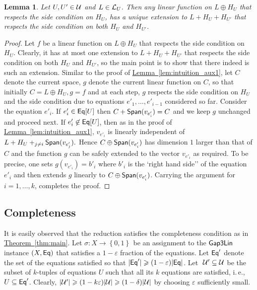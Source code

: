 \documentclass[11pt]{article}
\numberwithin{equation}{section}
\newtheorem{lemma}[theorem]{Lemma}
\theoremstyle{definition}
\theoremstyle{plain}
\newcommand{\ie}{i.\,e.}
\newcommand{\expref}[2]{\hyperref[#2]{#1~\ref{#2}}}
\newcommand\set[1]{{\left\{ #1 \right\}}}
\newcommand\power[1]{\set{0,1}^{#1}}
\newcommand\eps{\varepsilon}
\newcommand*\xor{\mathbin{\oplus}}
\renewcommand\geq{\geqslant}
\begin{document}
\begin{lemma}\label{lem:intuition_aux3} Let $U, U' \in {\cal U}$ and $L \in {\cal L}_U$.  Then any linear function on $L\xor H_U$ that respects the side condition on $H_U$,
has a unique extension to $L + H_U + H_{U'}$ that respects the side condition on both $H_U$ and $H_{U'}$.
\end{lemma}
\begin{proof} Let $f$ be a linear function on $L\xor H_U$ that respects the side condition on $H_U$. Clearly, it has at most one extension
to $L + H_U + H_{U'}$ that respects the side condition on both $H_U$ and $H_{U'}$, so the main point is to show that  there indeed is
such an extension. Similar to the proof of \expref{Lemma}{lem:intuition_aux1}, let $C$ denote the current space, $g$ denote the current linear function on $C$,
 so that initially $C = L \xor H_U, g = f$ and at each step,
$g$ respects the side condition on $H_U$ and the side condition due to equations $e'_1, \ldots, e'_{i-1}$ considered so far. Consider
the equation $e'_i$. If $e'_i \in {\sf Eq}[U]$ then $C + {\sf Span} (v_{e'_i}) = C$ and we keep $g$ unchanged and proceed next. If $e'_i \not\in {\sf Eq}[U]$, then
as in the proof of \expref{Lemma}{lem:intuition_aux1}, $v_{e'_i}$ is linearly independent of
$L + H_U +_{j \neq  i} {\sf Span}( v_{e'_j} ) . $ Hence $C \xor  {\sf Span}(v_{e'_i})$ has dimension $1$ larger than that of $C$ and
the function $g$ can be safely extended to
the  %
vector $v_{e'_i}$ as required. To be precise, one sets $g(v_{e'_i}) = b'_i$ where $b'_i$ is the
`right hand side'' of the equation $e'_i$ and then extends $g$ linearly to $C \xor  {\sf Span}(v_{e'_i})$. Carrying the argument for $i=1,\ldots,k$,
completes the proof.
\end{proof}

\subsection{Completeness}\label{section:completeness}
It is easily observed that the reduction satisfies the completeness condition as in \expref{Theorem}{thm:main}. Let
 $\sigma \colon X \to \power{}$ be an assignment to the ${\sf Gap3Lin}$ instance $(X, {\sf Eq})$  that satisfies
 a %
 $1-\eps$ fraction of
 the equations. Let ${\sf Eq}'$ denote the set of the equations satisfied so that $|{\sf Eq}'| \geq (1-\eps) |{\sf Eq}|$.
Let $~{\cal U}' \subseteq {\cal U}$ be the subset of $k$-tuples of equations $U$ such that all its $k$ equations are satisfied, \ie,
$U \subseteq {\sf Eq}'$. Clearly, $|{\cal U}'| \geq (1-k\eps)|{\cal U}| \geq (1-\delta) |{\cal U}|$ by choosing $\eps$ sufficiently
small.
%
\end{document}
